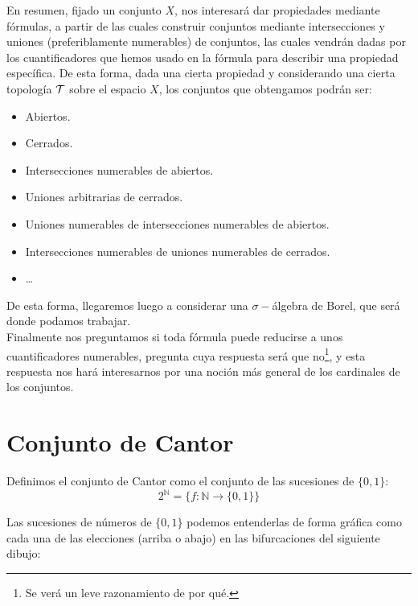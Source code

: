 En resumen, fijado un conjunto $X$, nos interesará dar propiedades mediante fórmulas, a partir de las cuales construir conjuntos mediante intersecciones y uniones (preferiblamente numerables) de conjuntos, las cuales vendrán dadas por los cuantificadores que hemos usado en la fórmula para describir una propiedad específica. De esta forma, dada una cierta propiedad y considerando una cierta topología $\mathcal{T}$ sobre el espacio $X$, los conjuntos que obtengamos podrán ser:
\begin{itemize}
    \item Abiertos.
    \item Cerrados.
    \item Intersecciones numerables de abiertos.
    \item Uniones arbitrarias de cerrados.
    \item Uniones numerables de intersecciones numerables de abiertos.
    \item Intersecciones numerables de uniones numerables de cerrados.
    \item \ldots
\end{itemize}
De esta forma, llegaremos luego a considerar una $\sigma-$álgebra de Borel, que será donde podamos trabajar.\\

Finalmente nos preguntamos si toda fórmula puede reducirse a unos cuantificadores numerables, pregunta cuya respuesta será que no\footnote{Se verá un leve razonamiento de por qué.}, y esta respuesta nos hará interesarnos por una noción más general de los cardinales de los conjuntos.

\section{Conjunto de Cantor}
\begin{definicion}
    Definimos el conjunto de Cantor como el conjunto de las sucesiones de $\{0,1\}$:
    \begin{equation*}
        2^{\mathbb{N}} = \{f:\mathbb{N}\to \{0,1\}\}
    \end{equation*}
\end{definicion}
\noindent
Las sucesiones de números de $\{{0,1}\}$ podemos entenderlas de forma gráfica como cada una de las elecciones (arriba o abajo) en las bifurcaciones del siguiente dibujo:
\begin{figure}[H]
    \centering
\end{figure}

